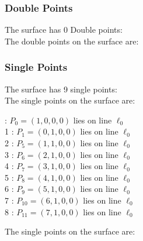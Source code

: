 \documentclass{article}
\begin{document}
{\subsubsection*{Double Points}
The surface has 0 Double points:\\
The double points on the surface are:\\
\begin{multicols}{2}
\noindent
\end{multicols}
\subsubsection*{Single Points}
The surface has 9 single points:\\
The single points on the surface are:\\
\begin{multicols}{2}
 : $P_{0}=( 1, 0, 0, 0 )$ lies on line $\ell_{0}$\\
1 : $P_{1}=( 0, 1, 0, 0 )$ lies on line $\ell_{0}$\\
2 : $P_{5}=( 1, 1, 0, 0 )$ lies on line $\ell_{0}$\\
3 : $P_{6}=( 2, 1, 0, 0 )$ lies on line $\ell_{0}$\\
4 : $P_{7}=( 3, 1, 0, 0 )$ lies on line $\ell_{0}$\\
5 : $P_{8}=( 4, 1, 0, 0 )$ lies on line $\ell_{0}$\\
6 : $P_{9}=( 5, 1, 0, 0 )$ lies on line $\ell_{0}$\\
7 : $P_{10}=( 6, 1, 0, 0 )$ lies on line $\ell_{0}$\\
8 : $P_{11}=( 7, 1, 0, 0 )$ lies on line $\ell_{0}$\\
\end{multicols}
The single points on the surface are:\\
}
\end{document}
